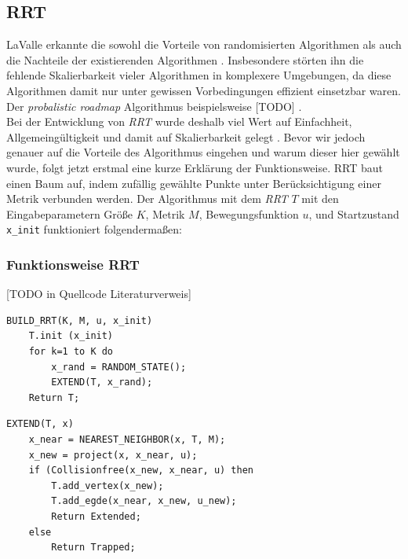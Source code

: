 \subsection{RRT}
\label{RRT}
LaValle erkannte die sowohl die Vorteile von randomisierten Algorithmen als auch die Nachteile der existierenden Algorithmen \citep[vlg. Kap 1][]{Lav98}. Insbesondere störten ihn die fehlende Skalierbarkeit vieler Algorithmen in komplexere Umgebungen, da diese Algorithmen damit nur unter gewissen Vorbedingungen effizient einsetzbar waren. Der \textit{probalistic roadmap} Algorithmus \citep{AmWu96} beispielsweise [TODO] .\\
Bei der Entwicklung von \textit{RRT} wurde deshalb viel Wert auf Einfachheit, Allgemeingültigkeit und damit auf Skalierbarkeit gelegt \citep[vlg. Kap 3][]{Lav98}. Bevor wir jedoch genauer auf die Vorteile des Algorithmus eingehen und warum dieser hier gewählt wurde, folgt jetzt erstmal eine kurze Erklärung der Funktionsweise. RRT baut einen Baum auf, indem zufällig gewählte Punkte unter Berücksichtigung einer Metrik verbunden werden. Der Algorithmus mit dem \textit{RRT} $T$ mit den Eingabeparametern Größe $K$, Metrik $M$, Bewegungsfunktion $u$, und Startzustand \verb|x_init|  funktioniert folgendermaßen:

\subsubsection{Funktionsweise RRT}
[TODO in Quellcode Literaturverweis]
\lstset{language=Pascal, stepnumber=1, numbers=left}
\begin{lstlisting}
BUILD_RRT(K, M, u, x_init)
	T.init (x_init)
	for k=1 to K do
		x_rand = RANDOM_STATE();
		EXTEND(T, x_rand);
	Return T;
\end{lstlisting}
\begin{lstlisting}
EXTEND(T, x)
	x_near = NEAREST_NEIGHBOR(x, T, M);
	x_new = project(x, x_near, u);
	if (Collisionfree(x_new, x_near, u) then
		T.add_vertex(x_new);
		T.add_egde(x_near, x_new, u_new);
		Return Extended;
	else
		Return Trapped;
\end{lstlisting}

